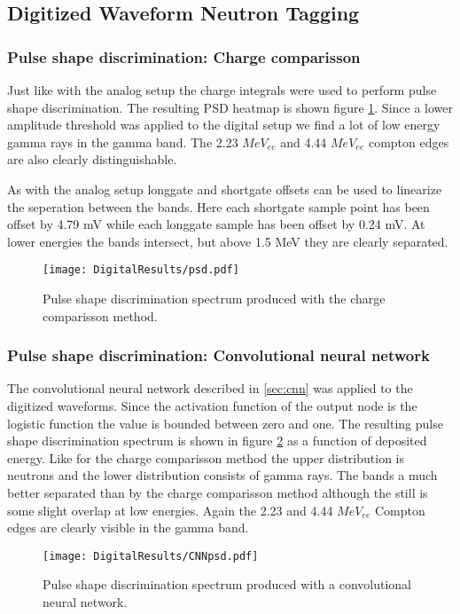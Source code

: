 \documentclass[main.tex]{subfiles}
\begin{document}
\subsection{Digitized Waveform Neutron Tagging}

\subsubsection{Pulse shape discrimination: Charge comparisson}
Just like with the analog setup the charge integrals were used to perform pulse shape discrimination. The resulting PSD heatmap is shown figure \ref{fig:psd_d}. Since a lower amplitude threshold was applied to the digital setup we find a lot of low energy gamma rays in the gamma band. The 2.23 $MeV_{ee}$ and 4.44 $MeV_{ee}$ compton edges are also clearly distinguishable. 

As with the analog setup longgate and shortgate offsets can be used to linearize the seperation between the bands. Here each shortgate sample point has been offset by 4.79 mV while each longgate sample has been offset by 0.24 mV. At lower energies the bands intersect, but above 1.5 MeV they are clearly separated.

\begin{figure}[ht]
    \centering
        \texttt{[image: DigitalResults/psd.pdf]}
        \caption{Pulse shape discrimination spectrum produced with the charge comparisson method.}
        \label{fig:psd_d}
\end{figure}

\subsubsection{Pulse shape discrimination: Convolutional neural network}
The convolutional neural network described in \ref{sec:cnn} was applied to the digitized waveforms. Since the activation function of the output node is the logistic function the value is bounded between zero and one. The resulting pulse shape discrimination spectrum is shown in figure \ref{fig:cnn_E} as a function of deposited energy. Like for the charge comparisson method the upper distribution is neutrons and the lower distribution consists of gamma rays. The bands a much better separated than by the charge comparisson method although the still is some slight overlap at low energies. Again the 2.23 and 4.44 $MeV_{ee}$ Compton edges are clearly visible in the gamma band. 

\begin{figure}[ht]
    \centering
        \texttt{[image: DigitalResults/CNNpsd.pdf]}
        \caption{Pulse shape discrimination spectrum produced with a convolutional neural network.}
    \label{fig:cnn_E} 
\end{figure}
\end{document}
